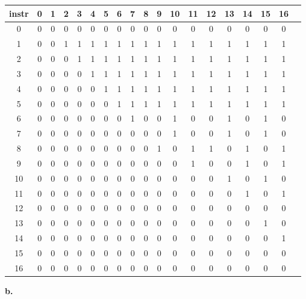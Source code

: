 \small
\begin{tabular}{c || c c c c c c c c c c c c c c c c c c}
\hline
instr & \textbf{0} & \textbf{1} & \textbf{2} & \textbf{3} & \textbf{4} & \textbf{5} & \textbf{6} & \textbf{7} & \textbf{8} & \textbf{9} & \textbf{10} & \textbf{11} & \textbf{12} & \textbf{13} & \textbf{14} & \textbf{15} & \textbf{16}\\
\hline\hline
0 & 0 & 0 & 0 & 0 & 0 & 0 & 0 & 0 & 0 & 0 & 0 & 0 & 0 & 0 & 0 & 0 & 0\\
\hline 
1 & 0 & 0 & 1 & 1 & 1 & 1 & 1 & 1 & 1 & 1 & 1 & 1 & 1 & 1 & 1 & 1 & 1\\
\hline 
2 & 0 & 0 & 0 & 1 & 1 & 1 & 1 & 1 & 1 & 1 & 1 & 1 & 1 & 1 & 1 & 1 & 1\\
\hline 
3 & 0 & 0 & 0 & 0 & 1 & 1 & 1 & 1 & 1 & 1 & 1 & 1 & 1 & 1 & 1 & 1 & 1\\
\hline 
4 & 0 & 0 & 0 & 0 & 0 & 1 & 1 & 1 & 1 & 1 & 1 & 1 & 1 & 1 & 1 & 1 & 1\\
\hline 
5 & 0 & 0 & 0 & 0 & 0 & 0 & 1 & 1 & 1 & 1 & 1 & 1 & 1 & 1 & 1 & 1 & 1\\
\hline 
6 & 0 & 0 & 0 & 0 & 0 & 0 & 0 & 1 & 0 & 0 & 1 & 0 & 0 & 1 & 0 & 1 & 0\\
\hline 
7 & 0 & 0 & 0 & 0 & 0 & 0 & 0 & 0 & 0 & 0 & 1 & 0 & 0 & 1 & 0 & 1 & 0\\
\hline 
8 & 0 & 0 & 0 & 0 & 0 & 0 & 0 & 0 & 0 & 1 & 0 & 1 & 1 & 0 & 1 & 0 & 1\\
\hline 
9 & 0 & 0 & 0 & 0 & 0 & 0 & 0 & 0 & 0 & 0 & 0 & 1 & 0 & 0 & 1 & 0 & 1\\
\hline 
10 & 0 & 0 & 0 & 0 & 0 & 0 & 0 & 0 & 0 & 0 & 0 & 0 & 0 & 1 & 0 & 1 & 0\\
\hline 
11 & 0 & 0 & 0 & 0 & 0 & 0 & 0 & 0 & 0 & 0 & 0 & 0 & 0 & 0 & 1 & 0 & 1\\
\hline 
12 & 0 & 0 & 0 & 0 & 0 & 0 & 0 & 0 & 0 & 0 & 0 & 0 & 0 & 0 & 0 & 0 & 0\\
\hline 
13 & 0 & 0 & 0 & 0 & 0 & 0 & 0 & 0 & 0 & 0 & 0 & 0 & 0 & 0 & 0 & 1 & 0\\
\hline 
14 & 0 & 0 & 0 & 0 & 0 & 0 & 0 & 0 & 0 & 0 & 0 & 0 & 0 & 0 & 0 & 0 & 1\\
\hline 
15 & 0 & 0 & 0 & 0 & 0 & 0 & 0 & 0 & 0 & 0 & 0 & 0 & 0 & 0 & 0 & 0 & 0\\
\hline 
16 & 0 & 0 & 0 & 0 & 0 & 0 & 0 & 0 & 0 & 0 & 0 & 0 & 0 & 0 & 0 & 0 & 0\\
\hline 
\end{tabular}

\par
\textbf{b.}\\

\normalsize